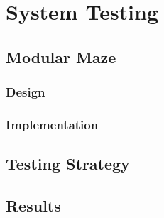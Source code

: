 
\chapter{System Testing}\label{systest}

\section{Modular Maze}\label{mech/maze}

\subsection{Design}\label{mech/maze/design}

\subsection{Implementation}\label{mech/maze/impl}



\section{Testing Strategy}\label{systest/strategy}



\section{Results}\label{systest/results}
